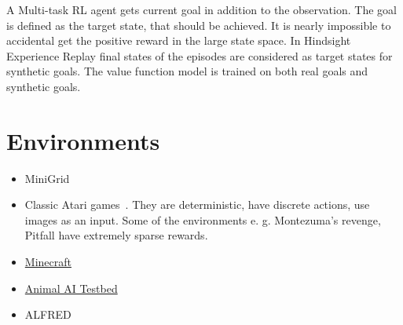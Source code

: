 \documentclass{article}
\begin{document}
A Multi-task RL agent gets current goal in addition to the observation. The goal is defined as the target state, that should be achieved. It is nearly impossible to accidental get the positive reward in the large state space. In Hindsight Experience Replay final states of the episodes are considered as target states for synthetic goals. The value function model is trained on both real goals and synthetic goals.

\section{Environments}

\begin{itemize}
  \item MiniGrid~\citep{gym_minigrid}
  \item Classic Atari games~\citep{Mnih2013PlayingAW}. They are deterministic, have discrete actions, use images as an input. Some of the environments e. g. Montezuma's revenge, Pitfall have extremely sparse rewards.
  \item \href{https://minerl.io/competition/}{Minecraft}
  \item \href{http://animalaiolympics.com/AAI/}{Animal AI Testbed} 
  \item ALFRED~\citep{ALFRED20}
\end{itemize}



\end{document}
